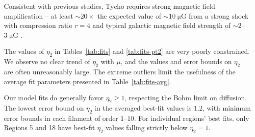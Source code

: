 \documentclass[iop, apj, numberedappendix, twocolappendix]{emulateapj}
\newcommand*{\mt}{\mathrm}
\newcommand*{\unit}[1]{\;\mt{#1}}  %
\newcommand*{\abt}{\mathord{\sim}} %
\newcommand*{\Ecut}{E_{\mt{cut}}}
\newcommand*{\muG}{\unit{\mu G}}
\begin{document}
Consistent with previous studies, Tycho requires strong magnetic field
amplification -- at least $\abt 20\times$ the expected value of $\abt 10 \muG$
from a strong shock with compression ratio $r=4$ and typical galactic magnetic
field strength of $\abt 2$--$3 \muG$ \citep{lyne1989, han2006}.




The values of $\eta_2$ in Tables~\ref{tab:fits} and \ref{tab:fits-pt2} are very
poorly constrained.  We observe no clear trend of $\eta_2$ with $\mu$, and the
values and error bounds on $\eta_2$ are often unreasonably large.  The extreme
outliers limit the usefulness of the average fit parameters presented in
Table~\ref{tab:fits-avg}.

Our model fits do generally favor $\eta_2 \geq 1$, respecting the Bohm limit on
diffusion.  The lowest error bound on $\eta_2$ in the averaged best-fit values
is $1.2$, with minimum error bounds in each filament of order $1$--$10$.  For
individual regions' best fits, only Regions 5 and 18 have best-fit $\eta_2$
values falling strictly below $\eta_2 = 1$.  
\end{document}
